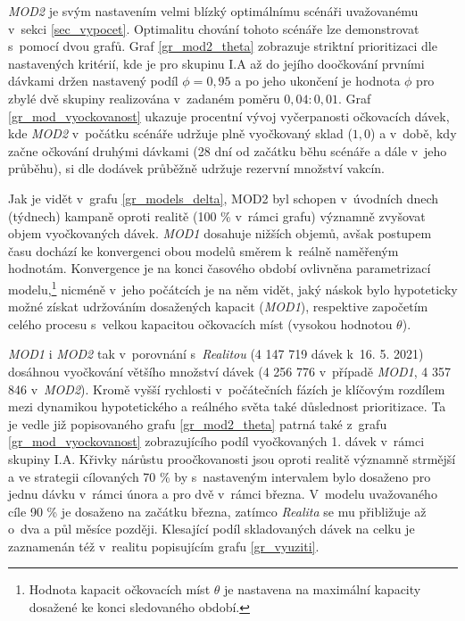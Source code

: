 \emph{MOD2} je svým nastavením velmi blízký optimálnímu scénáři uvažovanému v~sekci \ref{sec_vypocet}. Optimalitu chování tohoto scénáře lze demonstrovat s~pomocí dvou grafů. Graf \ref{gr_mod2_theta} zobrazuje striktní prioritizaci dle nastavených kritérií, kde je pro skupinu I.A až do jejího doočkování prvními dávkami držen nastavený podíl $\phi=0,95$ a po jeho ukončení je hodnota $\phi$ pro zbylé dvě skupiny realizována v~zadaném poměru $0,04:0,01$. Graf \ref{gr_mod_vyockovanost} ukazuje procentní vývoj vyčerpanosti očkovacích dávek, kde \emph{MOD2} v~počátku scénáře udržuje plně vyočkovaný sklad ($1,0$) a v~době, kdy začne očkování druhými dávkami (28 dní od začátku běhu scénáře a dále v~jeho průběhu), si dle dodávek průběžně udržuje rezervní množství vakcín.

Jak je vidět v~grafu \ref{gr_models_delta}, MOD2 byl schopen v~úvodních dnech (týdnech) kampaně oproti realitě (100 \% v~rámci grafu) významně zvyšovat objem vy\-oč\-ko\-va\-ných dávek. \emph{MOD1} dosahuje nižších objemů, avšak postupem času dochází ke konvergenci obou modelů směrem k~reálně naměřeným hodnotám. Konvergence je na konci časového období ovlivněna parametrizací modelu,\footnote{Hodnota kapacit očkovacích míst $\theta$ je nastavena na maximální kapacity dosažené ke konci sledovaného období.} nicméně v~jeho počátcích je na něm vidět, jaký náskok bylo hypoteticky možné získat udržováním dosažených kapacit (\emph{MOD1}), respektive započetím celého procesu s~velkou kapacitou očkovacích míst (vysokou hodnotou $\theta$).

\emph{MOD1} i \emph{MOD2} tak v~porovnání s~\emph{Realitou} (4 147 719 dávek k~16. 5. 2021) dosáhnou vyočkování většího množství dávek (4 256 776 v~případě \emph{MOD1}, 4 357 846 v~\emph{MOD2}). Kromě vyšší rychlosti v~počátečních fázích je klíčovým rozdílem mezi dynamikou hypotetického a reálného světa také důslednost prioritizace. Ta je vedle již popisovaného grafu \ref{gr_mod2_theta} patrná také z~grafu \ref{gr_mod_vyockovanost} zobrazujícího podíl vyočkovaných 1. dávek v~rámci skupiny I.A. Křivky nárůstu proočkovanosti jsou oproti realitě významně strmější a ve strategii cílovaných 70 \% by s~nastaveným intervalem bylo dosaženo pro jednu dávku v~rámci února a pro dvě v~rámci března. V~modelu uvažovaného cíle 90 \% je dosaženo na začátku března, zatímco \emph{Realita} se mu přibližuje až o~dva a půl měsíce později. Klesající podíl skladovaných dávek na celku je zaznamenán též v~realitu popisujícím grafu \ref{gr_vyuziti}.


